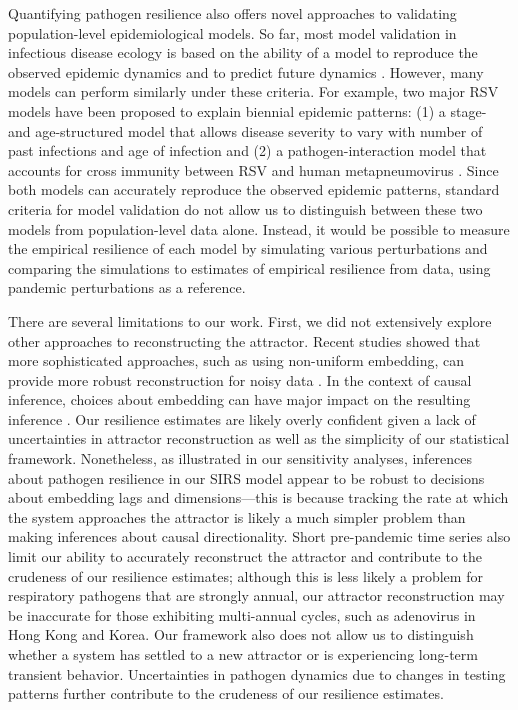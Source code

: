 \documentclass[12pt]{article}
\begin{document}
Quantifying pathogen resilience also offers novel approaches to validating population-level epidemiological models.
So far, most model validation in infectious disease ecology is based on the ability of a model to reproduce the observed epidemic dynamics and to predict future dynamics \citep{grenfell2002dynamics,bhattacharyya2015cross,pitzer2015environmental,dean2018human,pons2018serotype}.
However, many models can perform similarly under these criteria.
For example, two major RSV models have been proposed to explain biennial epidemic patterns: (1) a stage- and age-structured model that allows disease severity to vary with number of past infections and age of infection \citep{pitzer2015environmental} and (2) a pathogen-interaction model that accounts for cross immunity between RSV and human metapneumovirus \citep{bhattacharyya2015cross}.
Since both models can accurately reproduce the observed epidemic patterns, standard criteria for model validation do not allow us to distinguish between these two models from population-level data alone.
Instead, it would be possible to measure the empirical resilience of each model by simulating various perturbations and comparing the simulations to estimates of empirical resilience from data, using pandemic perturbations as a reference.

There are several limitations to our work.
First, we did not extensively explore other approaches to reconstructing the attractor.
Recent studies showed that more sophisticated approaches, such as using non-uniform embedding, can provide more robust reconstruction for noisy data \citep{tan2023selecting}.
In the context of causal inference, choices about embedding can have major impact on the resulting inference \citep{cobey2016limits}.
Our resilience estimates are likely overly confident given a lack of uncertainties in attractor reconstruction as well as the simplicity of our statistical framework.
Nonetheless, as illustrated in our sensitivity analyses, inferences about pathogen resilience in our SIRS model appear to be robust to decisions about embedding lags and dimensions---this is because tracking the rate at which the system approaches the attractor is likely a much simpler problem than making inferences about causal directionality.
Short pre-pandemic time series also limit our ability to accurately reconstruct the attractor and contribute to the crudeness of our resilience estimates;
although this is less likely a problem for respiratory pathogens that are strongly annual, our attractor reconstruction may be inaccurate for those exhibiting multi-annual cycles, such as adenovirus in Hong Kong and Korea.
Our framework also does not allow us to distinguish whether a system has settled to a new attractor or is experiencing long-term transient behavior.
Uncertainties in pathogen dynamics due to changes in testing patterns further contribute to the crudeness of our resilience estimates.
\end{document}
